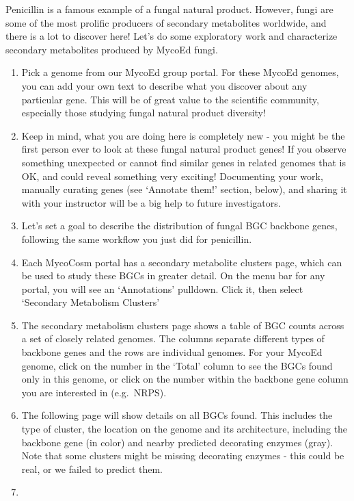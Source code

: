 \documentclass[
  letterpaper,
  DIV=11,
  numbers=noendperiod]{scrreprt}
\providecommand{\tightlist}{%
  \setlength{\itemsep}{0pt}\setlength{\parskip}{0pt}}
\begin{document}
Penicillin is a famous example of a fungal natural product. However,
fungi are some of the most prolific producers of secondary metabolites
worldwide, and there is a lot to discover here! Let's do some
exploratory work and characterize secondary metabolites produced by
MycoEd fungi.

\begin{enumerate}
\def\labelenumi{\arabic{enumi}.}
\tightlist
\item
  Pick a genome from our MycoEd group portal. For these MycoEd genomes,
  you can add your own text to describe what you discover about any
  particular gene. This will be of great value to the scientific
  community, especially those studying fungal natural product diversity!
\item
  Keep in mind, what you are doing here is completely new - you might be
  the first person ever to look at these fungal natural product genes!
  If you observe something unexpected or cannot find similar genes in
  related genomes that is OK, and could reveal something very exciting!
  Documenting your work, manually curating genes (see `Annotate them!'
  section, below), and sharing it with your instructor will be a big
  help to future investigators.
\item
  Let's set a goal to describe the distribution of fungal BGC backbone
  genes, following the same workflow you just did for penicillin.
\item
  Each MycoCosm portal has a secondary metabolite clusters page, which
  can be used to study these BGCs in greater detail. On the menu bar for
  any portal, you will see an `Annotations' pulldown. Click it, then
  select `Secondary Metabolism Clusters'
\item
  The secondary metabolism clusters page shows a table of BGC counts
  across a set of closely related genomes. The columns separate
  different types of backbone genes and the rows are individual genomes.
  For your MycoEd genome, click on the number in the `Total' column to
  see the BGCs found only in this genome, or click on the number within
  the backbone gene column you are interested in (e.g.~NRPS).
\item
  The following page will show details on all BGCs found. This includes
  the type of cluster, the location on the genome and its architecture,
  including the backbone gene (in color) and nearby predicted decorating
  enzymes (gray). Note that some clusters might be missing decorating
  enzymes - this could be real, or we failed to predict them.
\item

\end{enumerate}
\end{document}
